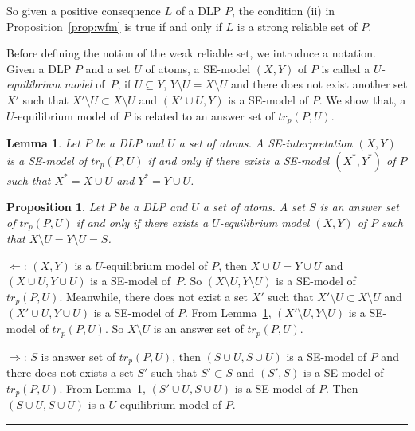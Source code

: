 \documentclass{article}
\newtheorem{proposition}{Proposition}
\newtheorem{lemma}{Lemma}
\newenvironment{proofs}{{\bf Proof Sketch:}}{\rule{2mm}{2mm}\\[-.5em] }
\newcommand{\trp}{tr_p}
\begin{document}
So given a positive consequence $L$ of a DLP $P$, the condition (ii) in Proposition~\ref{prop:wfm} is true if and only if $L$ is a strong reliable set of $P$.


Before defining the notion of the weak reliable set, we introduce a notation.
Given a DLP $P$ and a set $U$ of atoms, a SE-model $(X, Y)$ of $P$ is called a {\em $U$-equilibrium model} of~$P$, if $U\subseteq Y$, ${Y\setminus U} = X\setminus U$ and there does not exist another set $X'$ such that $X'\setminus U \subset X\setminus U$ and $(X'\cup U, Y)$ is a SE-model of $P$.
We show that, a $U$-equilibrium model of $P$ is related to an answer set of $\trp(P, U)$.

\begin{lemma}\label{lem:1}
  Let $P$ be a DLP and $U$ a set of atoms. A SE-interpretation $(X, Y)$ is a SE-model of $\trp(P, U)$ if and only if there exists a SE-model $(X^*, Y^*)$ of $P$ such that $X^* = X\cup U$ and $Y^* = Y\cup U$.
\end{lemma}

\begin{proposition}\label{prop:equil}
  Let $P$ be a DLP and $U$ a set of atoms. A set $S$ is an answer set of $\trp(P, U)$ if and only if there exists a $U$-equilibrium model $(X, Y)$ of $P$ such that $X\setminus U = Y\setminus U = S$.
\end{proposition}
\begin{proofs}
  $\Leftarrow$: $(X, Y)$ is a $U$-equilibrium model of $P$, then $X\cup U = Y\cup U$ and $(X\cup U, Y\cup U)$ is a SE-model of~$P$. So $(X\setminus U, Y\setminus U)$ is a SE-model of $\trp(P, U)$. Meanwhile, there does not exist a set $X'$ such that $X'\setminus U \subset X\setminus U$ and $(X'\cup U, Y\cup U)$ is a SE-model of $P$. From Lemma~\ref{lem:1},
   $(X'\setminus U, Y\setminus U)$ is a SE-model of $\trp(P, U)$. So $X\setminus U$ is an answer set of $\trp(P, U)$.

  $\Rightarrow$: $S$ is answer set of $\trp(P, U)$, then $(S\cup U, S\cup U)$ is a SE-model of $P$ and there does not exists a set $S'$ such that $S'\subset S$ and $(S', S)$ is a SE-model of $\trp(P, U)$. From Lemma~\ref{lem:1},
  $(S'\cup U, S\cup U)$ is a SE-model of $P$. Then $(S\cup U, S\cup U)$ is a $U$-equilibrium model of $P$.
\end{proofs}
\end{document}
